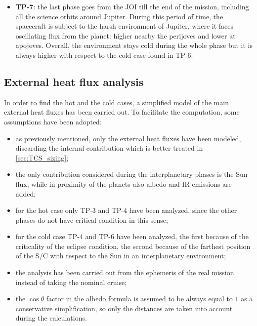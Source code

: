 \begin{itemize}
    \item \textbf{TP-7}:
    the last phase goes from the JOI till the end of the mission, including all the science orbits around Jupiter.
    During this period of time, the spacecraft is subject to the harsh environment of Jupiter, where it faces oscillating flux from the planet: higher nearby the perijoves and lower at apojoves.
    Overall, the environment stays cold during the whole phase but it is always higher with respect to the cold case found in TP-6.
    
\end{itemize}

\subsection{External heat flux analysis}
\label{subsec:heat_flux_analysis}

In order to find the hot and the cold cases, a simplified model of the main external heat fluxes has been carried out. To facilitate the computation, some assumptions have been adopted:
\begin{itemize}
    \item as previously mentioned, only the external heat fluxes have been modeled, discarding the internal contribution which is better treated in \autoref{sec:TCS_sizing}; \\
    \item the only contribution considered during the interplanetary phases is the Sun flux, while in proximity of the planets also albedo and IR emissions are added;
    \item for the hot case only TP-3 and TP-4 have been analyzed, since the other phases do not have critical condition in this sense;
    \item for the cold case TP-4 and TP-6 have been analyzed, the first because of the criticality of the eclipse condition, the second because of the farthest position of the S/C with respect to the Sun in an interplanetary environment;
    \item the analysis has been carried out from the ephemeris of the real mission instead of taking the nominal cruise;
    \item the $\cos \theta$ factor in the albedo formula is assumed to be always equal to $1$ as a conservative simplification, so only the distances are taken into account during the calculations.
\end{itemize}


